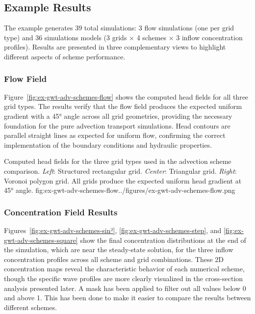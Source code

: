

\subsection{Example Results}

The example generates 39 total simulations: 3 flow simulations (one per grid type) and 36 simulations models (3 grids $\times$ 4 schemes $\times$ 3 inflow concentration profiles). Results are presented in three complementary views to highlight different aspects of scheme performance.

\subsubsection{Flow Field}

Figure~\ref{fig:ex-gwt-adv-schemes-flow} shows the computed head fields for all three grid types. The results verify that the flow field produces the expected uniform gradient with a 45° angle across all grid geometries, providing the necessary foundation for the pure advection transport simulations. Head contours are parallel straight lines as expected for uniform flow, confirming the correct implementation of the boundary conditions and hydraulic properties.

\begin{StandardFigure}{
    Computed head fields for the three grid types used in the advection scheme comparison. \textit{Left}: Structured rectangular grid. \textit{Center}: Triangular grid. \textit{Right}: Voronoi polygon grid. All grids produce the expected uniform head gradient at 45° angle.
}{fig:ex-gwt-adv-schemes-flow}{../figures/ex-gwt-adv-schemes-flow.png}
\end{StandardFigure}

\subsubsection{Concentration Field Results}

Figures~\ref{fig:ex-gwt-adv-schemes-sin²}, \ref{fig:ex-gwt-adv-schemes-step}, and \ref{fig:ex-gwt-adv-schemes-square} show the final concentration distributions at the end of the simulation, which are near the steady-state solution, for the three inflow concentration profiles across all scheme and grid combinations. These 2D concentration maps reveal the characteristic behavior of each numerical scheme, though the specific wave profiles are more clearly visualized in the cross-section analysis presented later. A mask has been applied to filter out all values below 0 and above 1. This has been done to make it easier to compare the results between different schemes.

